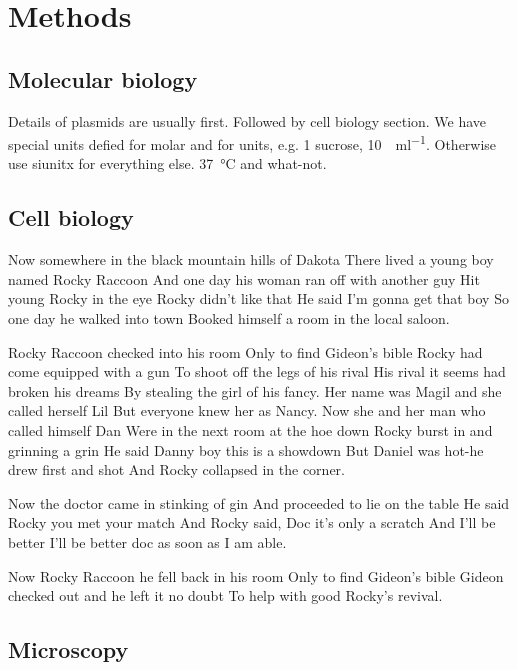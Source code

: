 
\section*{Methods}\label{s:methods}

\subsection*{Molecular biology}

Details of plasmids are usually first.
Followed by cell biology section.
We have special units defied for molar and for units, e.g. \SI{1}{\Molar} sucrose, \SI{10}{\Units\per\milli\litre}.
Otherwise use siunitx for everything else. \SI{37}{\degreeCelsius} and what-not.

\subsection*{Cell biology}

Now somewhere in the black mountain hills of Dakota
There lived a young boy named Rocky Raccoon
And one day his woman ran off with another guy
Hit young Rocky in the eye Rocky didn’t like that
He said I’m gonna get that boy
So one day he walked into town
Booked himself a room in the local saloon.

Rocky Raccoon checked into his room
Only to find Gideon’s bible
Rocky had come equipped with a gun
To shoot off the legs of his rival
His rival it seems had broken his dreams
By stealing the girl of his fancy.
Her name was Magil and she called herself Lil
But everyone knew her as Nancy.
Now she and her man who called himself Dan
Were in the next room at the hoe down
Rocky burst in and grinning a grin
He said Danny boy this is a showdown
But Daniel was hot-he drew first and shot
And Rocky collapsed in the corner.

Now the doctor came in stinking of gin
And proceeded to lie on the table
He said Rocky you met your match
And Rocky said, Doc it’s only a scratch
And I’ll be better I’ll be better doc as soon as I am able.

Now Rocky Raccoon he fell back in his room
Only to find Gideon’s bible
Gideon checked out and he left it no doubt
To help with good Rocky’s revival.

\subsection*{Microscopy}

